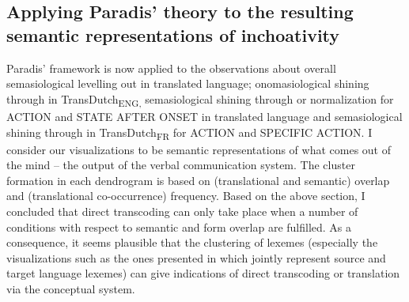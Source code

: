 \subsection{Applying Paradis’ theory to the resulting semantic representations of inchoativity}
\label{sec:5.3.3}  
Paradis’ framework is now applied to the observations about overall semasiological levelling out in translated language; onomasiological shining through in TransDutch\textsubscript{ENG,} semasiological shining through or normalization for ACTION and STATE AFTER ONSET in translated language and semasiological shining through in TransDutch\textsubscript{FR} for ACTION and SPECIFIC ACTION. I consider our visualizations to be semantic representations of what comes out of the mind – the output of the verbal communication system. The cluster formation in each dendrogram is based on (translational and semantic) overlap and (translational co-occurrence) frequency. Based on the above section, I concluded that direct transcoding can only take place when a number of conditions with respect to semantic and form overlap are fulfilled. As a consequence, it seems plausible that the clustering of lexemes (especially the visualizations such as the ones presented in  which jointly represent source and target language lexemes) can give indications of direct transcoding or translation via the conceptual system.

